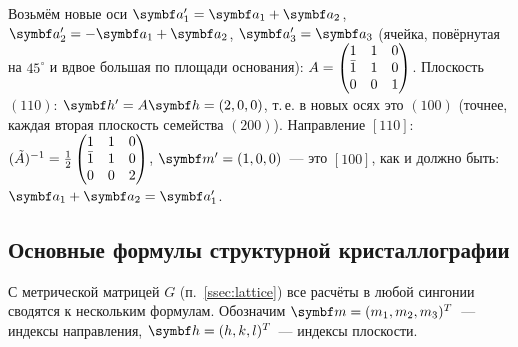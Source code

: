 \begin{primer}
Возьмём новые оси $\vb a'_1=\vb a_1+\vb a_2$, $\vb a'_2=-\vb a_1+\vb a_2$, $\vb a'_3=\vb a_3$
(ячейка, повёрнутая на $45^\circ$ и вдвое большая по площади основания):
$A=\begin{pmatrix}1&1&0\\\bar{1}&1&0\\0&0&1\end{pmatrix}$. Плоскость $(110)$:
$\vb h'=A\vb h=(2,0,0)$, т.\,е. в новых осях это $(100)$ (точнее, каждая
вторая плоскость семейства $(200)$). Направление $[110]$:
$(\tilde A)^{-1}=\frac12\begin{pmatrix}1&1&0\\\bar{1}&1&0\\0&0&2\end{pmatrix}$,
$\vb m'=(1,0,0)$~— это $[100]$, как и должно быть: $\vb a_1+\vb a_2=\vb a'_1$.
\end{primer}

\subsection{Основные формулы структурной кристаллографии}\label{ssec:formulas}

С метрической матрицей $G$ (п.~\ref{ssec:lattice}) все расчёты в любой
сингонии сводятся к нескольким формулам. Обозначим $\vb m=(m_1,m_2,m_3)^T$~—
индексы направления, $\vb h=(h,k,l)^T$~— индексы плоскости.

